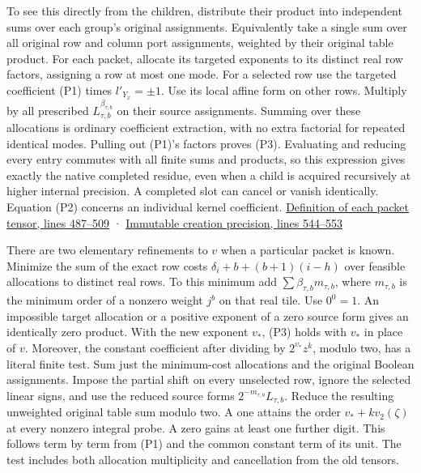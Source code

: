 \documentclass[11pt,a4paper]{article}
\begin{document}
To see this directly from the children, distribute their product into
independent sums over each group's original assignments. Equivalently
take a single sum over all original row and column port assignments,
weighted by their original table product. For each packet, allocate its
targeted exponents to its distinct real row factors, assigning a row at
most one mode. For a selected row use the targeted coefficient (P1)
times \(l'_{Y_x}=\pm1\). Use its local affine form on other rows.
Multiply by all prescribed \(L_{\tau,b}^{\beta_{\tau,b}}\) on their
source assignments. Summing over these allocations is ordinary
coefficient extraction, with no extra factorial for repeated identical
modes. Pulling out (P1)'s factors proves (P3). Evaluating and reducing
every entry commutes with all finite sums and products, so this
expression gives exactly the native completed residue, even when a child
is acquired recursively at higher internal precision. A completed slot
can cancel or vanish identically. Equation (P2) concerns an individual
kernel coefficient.
\href{https://github.com/openai/math/blob/main/preprints/The-Exponential-Time-Hypothesis-is-False-October-25-2026/build/quantitative-contraction.tex\#L487}{Definition
of each packet tensor, lines 487--509} ·
\href{https://github.com/openai/math/blob/main/preprints/The-Exponential-Time-Hypothesis-is-False-October-25-2026/build/quantitative-contraction.tex\#L544}{Immutable
creation precision, lines 544--553}

There are two elementary refinements to \(v\) when a particular packet
is known. Minimize the sum of the exact row costs
\(\delta_i+b+(b+1)(i-h)\) over feasible allocations to distinct real
rows. To this minimum add \(\sum\beta_{\tau,b}m_{\tau,b}\), where
\(m_{\tau,b}\) is the minimum order of a nonzero weight \(j^b\) on that
real tile. Use \(0^0=1\). An impossible target allocation or a positive
exponent of a zero source form gives an identically zero product. With
the new exponent \(v_*\), (P3) holds with \(v_*\) in place of \(v\).
Moreover, the constant coefficient after dividing by \(2^{v_*}z^k\),
modulo two, has a literal finite test. Sum just the minimum-cost
allocations and the original Boolean assignments. Impose the partial
shift on every unselected row, ignore the selected linear signs, and use
the reduced source forms \(2^{-m_{\tau,b}}L_{\tau,b}\). Reduce the
resulting unweighted original table sum modulo two. A one attains the
order \(v_*+k v_2(\zeta)\) at every nonzero integral probe. A zero gains
at least one further digit. This follows term by term from (P1) and the
common constant term of its unit. The test includes both allocation
multiplicity and cancellation from the old tensors.
\end{document}
